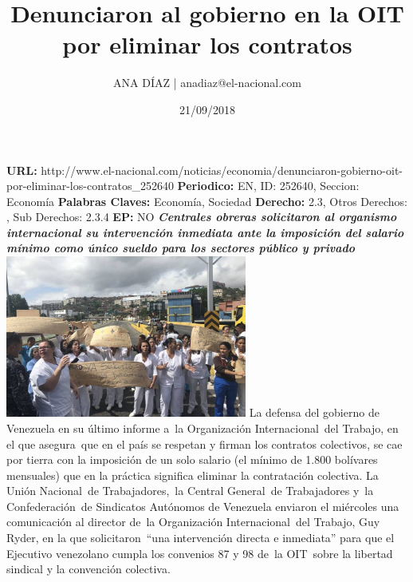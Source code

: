 \documentclass{article}%
\title{\textbf{Denunciaron al gobierno en la OIT por eliminar los contratos}}%
\author{ANA DÍAZ | anadiaz@el{-}nacional.com}%
\date{21/09/2018}%
\begin{document}
%
\normalsize%
\maketitle%
\textbf{URL: }%
http://www.el{-}nacional.com/noticias/economia/denunciaron{-}gobierno{-}oit{-}por{-}eliminar{-}los{-}contratos\_252640\newline%
%
\textbf{Periodico: }%
EN, %
ID: %
252640, %
Seccion: %
Economía\newline%
%
\textbf{Palabras Claves: }%
Economía, Sociedad\newline%
%
\textbf{Derecho: }%
2.3, %
Otros Derechos: %
, %
Sub Derechos: %
2.3.4\newline%
%
\textbf{EP: }%
NO\newline%
\newline%
%
\textbf{\textit{Centrales obreras solicitaron al organismo internacional su intervención inmediata ante la imposición del salario mínimo como único sueldo para los sectores público y privado}}%
\newline%
\newline%
%
\includegraphics[width=300px]{197.jpg}%
\newline%
%
La defensa del gobierno de Venezuela en su último informe a~la Organización Internacional~del Trabajo, en el que asegura~que en el país se respetan y firman los contratos colectivos, se cae por tierra con la imposición de un solo salario (el mínimo de 1.800 bolívares mensuales) que en la práctica significa eliminar la contratación colectiva.%
\newline%
%
La Unión Nacional~de Trabajadores,~la Central General~de Trabajadores y~la Confederación~de Sindicatos Autónomos de Venezuela enviaron el miércoles una comunicación al director de~la Organización Internacional~del Trabajo, Guy Ryder, en la que solicitaron~“una intervención directa e inmediata” para que el Ejecutivo venezolano cumpla los convenios 87 y 98 de~la OIT~sobre la libertad sindical y la convención colectiva.%
\newline%
\end{document}
